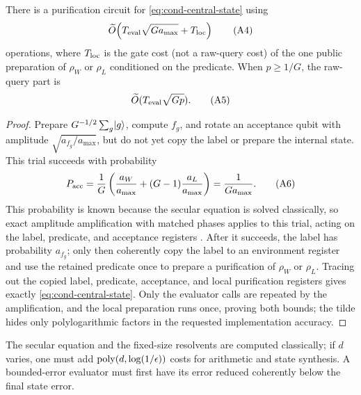 \begin{proposition}
\label{prop:cond-rejection-preparation}
There is a purification circuit for \eqref{eq:cond-central-state} using
\begin{equation*}
 \Otilde\!\left(T_{\rm eval}\sqrt{Ga_{\max}}
              +T_{\rm loc}\right)                                    \condtag{A4}\label{eq:cond-preparation-upper}
\end{equation*}
operations, where $T_{\rm loc}$ is the gate cost (not a raw-query cost) of
the one public preparation of $\rho_W$ or $\rho_L$ conditioned on the
predicate.  When $p\ge1/G$, the raw-query part is
\begin{equation*}
 \Otilde(T_{\rm eval}\sqrt{Gp}).                                     \condtag{A5}\label{eq:cond-preparation-upper-p}
\end{equation*}
\end{proposition}

\begin{proof}
Prepare $G^{-1/2}\sum_g\lvert g\rangle$, compute $f_g$, and rotate an acceptance
qubit with amplitude $\sqrt{a_{f_g}/a_{\max}}$, but do not yet copy the
label or prepare the internal state.  This trial succeeds with probability
\begin{equation*}
 P_{\rm acc}=\frac1G\left(\frac{a_W}{a_{\max}}+
                    (G-1)\frac{a_L}{a_{\max}}\right)
             =\frac1{Ga_{\max}}.                                      \condtag{A6}\label{eq:cond-acceptance}
\end{equation*}
This probability is known because the secular equation is solved
classically, so exact amplitude amplification with matched phases applies
to this trial, acting on the label, predicate, and acceptance registers
\cite{brassard2002-quantum-amplitude-amplification-and-estimation}.  After
it succeeds, the label has probability $a_{f_g}$; only then coherently copy
the label to an environment register and use the retained predicate once to
prepare a purification of $\rho_W$ or $\rho_L$.  Tracing out the copied
label, predicate, acceptance, and local purification registers gives
exactly \eqref{eq:cond-central-state}.  Only the evaluator calls are
repeated by the amplification, and the local preparation runs once, proving
both bounds; the tilde hides only polylogarithmic factors in the requested
implementation accuracy.
\end{proof}

The secular equation and the fixed-size resolvents are computed
classically; if $d$ varies, one must add $\operatorname{poly}(d,\log(1/\epsilon))$ costs
for arithmetic and state synthesis.  A bounded-error evaluator must first
have its error reduced coherently below the final state error.

